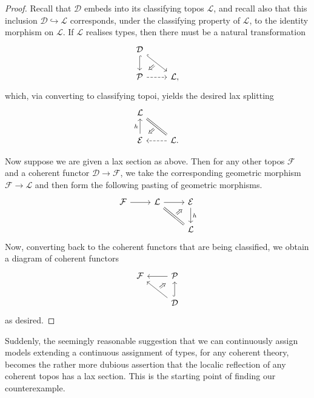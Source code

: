 \documentclass{article}
\theoremstyle{plain}
\theoremstyle{definition}
\newcommand{\dcat}{\mathcal{D}}
\newcommand{\pretopos}{\mathcal{P}}
\newcommand{\topos}{\mathcal{E}}
\newcommand{\ftopos}{\mathcal{F}}
\newcommand{\locrefl}{\mathcal{L}}
\begin{document}
	\begin{proof}
		Recall that $\dcat$ embeds into its classifying topos $\locrefl$, and recall also that this inclusion $\dcat \hookrightarrow \locrefl$ corresponds, under the classifying property of $\locrefl$, to the identity morphism on $\locrefl$.  If $\locrefl$ realises types, then there must be a natural transformation
		\[\begin{tikzcd}
			\dcat & \\
			\pretopos & \locrefl,
			\arrow[hook, from=1-1, to=2-1]
			\arrow[""{name=0, anchor=center, inner sep=0}, hook, from=1-1, to=2-2]
			\arrow[dashed, from=2-1, to=2-2]
			\arrow["\Rightarrow"{marking, allow upside down}, draw=none, from=0, to=2-1]
		\end{tikzcd}\]
		which, via converting to classifying topoi, yields the desired lax splitting
		\[\begin{tikzcd}
			\locrefl & \\
			\topos & \locrefl.
			\arrow[""{name=0, anchor=center, inner sep=0}, equals, from=1-1, to=2-2]
			\arrow["h", from=2-1, to=1-1]
			\arrow[dashed, from=2-2, to=2-1]
			\arrow["\Rightarrow"{marking, allow upside down}, draw=none, from=0, to=2-1]
		\end{tikzcd}\]
		
		Now suppose we are given a lax section as above.  Then for any other topos $\ftopos$ and a coherent functor $\dcat \to \ftopos$, we take the corresponding geometric morphism $\ftopos \to \locrefl$ and then form the following pasting of geometric morphisms.
		\[\begin{tikzcd}
			\ftopos & \locrefl & \topos \\
			&& \locrefl
			\arrow[from=1-1, to=1-2]
			\arrow[from=1-2, to=1-3]
			\arrow[""{name=0, anchor=center, inner sep=0}, equals, from=1-2, to=2-3]
			\arrow["h", from=1-3, to=2-3]
			\arrow["\Rightarrow"{marking, allow upside down}, draw=none, from=0, to=1-3]
		\end{tikzcd}\]
		Now, converting back to the coherent functors that are being classified, we obtain a diagram of coherent functors
		\[\begin{tikzcd}
			\ftopos & \pretopos \\
			& \dcat
			\arrow[from=1-2, to=1-1]
			\arrow[""{name=0, anchor=center, inner sep=0}, from=2-2, to=1-1]
			\arrow[hook, from=2-2, to=1-2]
			\arrow["\Rightarrow"{marking, allow upside down}, draw=none, from=0, to=1-2]
		\end{tikzcd}\]
		as desired.
	\end{proof}
	Suddenly, the seemingly reasonable suggestion that we can continuously assign models extending a continuous assignment of types, for any coherent theory, becomes the rather more dubious assertion that the localic reflection of any coherent topos has a lax section.  This is the starting point of finding our counterexample.
\end{document}
